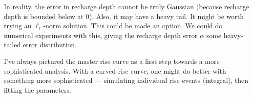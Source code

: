\documentclass[11pt,a4paper]{article}
\begin{document}
In reality, the error in recharge depth cannot be truly Gaussian
(because recharge depth is bounded below at 0).  Also, it may have a
heavy tail.  It might be worth trying an $\ell_1$-norm solution.  This
could be made an option.  We could do numerical experiments with this,
giving the recharge depth error $\alpha$ some heavy-tailed error
distribution.

I've always pictured the master rise curve as a first step towards a
more sophisticated analysis.  With a curved rise curve, one might do
better with something more sophisticated --- simulating individual
rise events (integral), then fitting the parameters.
\end{document}
